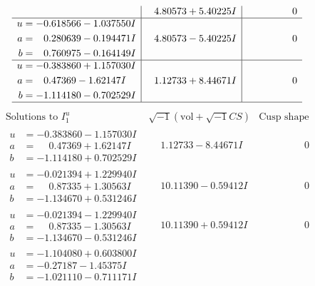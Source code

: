 \documentclass[1p]{elsarticle_modified}
\theoremstyle{definition}
\newcommand{\I}{\sqrt{-1}}
\begin{document}
$$\begin{array}{c|c|c}
 & \phantom{-}4.80573 + 5.40225 I & \phantom{-0.000000 } 0 \\ \hline\begin{aligned}
u &= -0.618566 - 1.037550 I \\
a &= \phantom{-}0.280639 - 0.194471 I \\
b &= \phantom{-}0.760975 - 0.164149 I\end{aligned}
 & \phantom{-}4.80573 - 5.40225 I & \phantom{-0.000000 } 0 \\ \hline\begin{aligned}
u &= -0.383860 + 1.157030 I \\
a &= \phantom{-}0.47369 - 1.62147 I \\
b &= -1.114180 - 0.702529 I\end{aligned}
 & \phantom{-}1.12733 + 8.44671 I & \phantom{-0.000000 } 0\\
 \hline 
 \end{array}$$\newpage$$\begin{array}{c|c|c}  
\text{Solutions to }I^u_{1}& \I (\text{vol} + \sqrt{-1}CS) & \text{Cusp shape}\\
 \hline 
\begin{aligned}
u &= -0.383860 - 1.157030 I \\
a &= \phantom{-}0.47369 + 1.62147 I \\
b &= -1.114180 + 0.702529 I\end{aligned}
 & \phantom{-}1.12733 - 8.44671 I & \phantom{-0.000000 } 0 \\ \hline\begin{aligned}
u &= -0.021394 + 1.229940 I \\
a &= \phantom{-}0.87335 + 1.30563 I \\
b &= -1.134670 + 0.531246 I\end{aligned}
 & \phantom{-}10.11390 - 0.59412 I & \phantom{-0.000000 } 0 \\ \hline\begin{aligned}
u &= -0.021394 - 1.229940 I \\
a &= \phantom{-}0.87335 - 1.30563 I \\
b &= -1.134670 - 0.531246 I\end{aligned}
 & \phantom{-}10.11390 + 0.59412 I & \phantom{-0.000000 } 0 \\ \hline\begin{aligned}
u &= -1.104080 + 0.603800 I \\
a &= -0.27187 - 1.45375 I \\
b &= -1.021110 - 0.711171 I\end{aligned}

\end{array}$$
\end{document}
